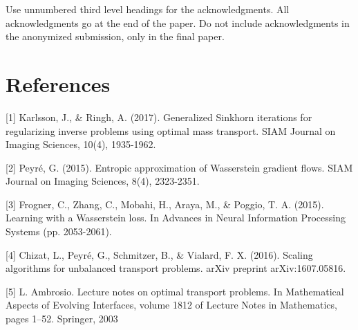 \documentclass{article}
\begin{document}
Use unnumbered third level headings for the acknowledgments. All
acknowledgments go at the end of the paper. Do not include
acknowledgments in the anonymized submission, only in the final paper.

\section*{References}
\medskip
\small

[1] Karlsson, J., \& Ringh, A. (2017). Generalized Sinkhorn iterations for regularizing inverse problems using optimal mass transport. SIAM Journal on Imaging Sciences, 10(4), 1935-1962.

[2] Peyré, G. (2015). Entropic approximation of Wasserstein gradient flows. SIAM Journal on Imaging Sciences, 8(4), 2323-2351.

[3] Frogner, C., Zhang, C., Mobahi, H., Araya, M., \& Poggio, T. A. (2015). Learning with a Wasserstein loss. In Advances in Neural Information Processing Systems (pp. 2053-2061).

[4] Chizat, L., Peyré, G., Schmitzer, B., \& Vialard, F. X. (2016). Scaling algorithms for unbalanced transport problems. arXiv preprint arXiv:1607.05816.
 
 [5] L. Ambrosio. Lecture notes on optimal transport problems. In Mathematical Aspects of Evolving Interfaces, volume 1812 of Lecture Notes in Mathematics, pages 1–52. Springer, 2003
\end{document}
